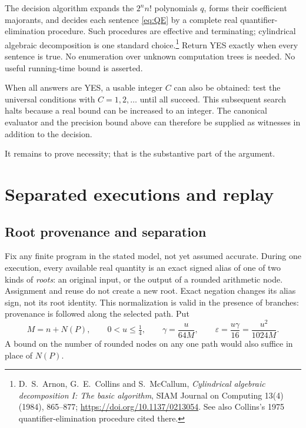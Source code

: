 \documentclass[11pt,a4paper]{article}
\theoremstyle{definition}
\theoremstyle{remark}
\begin{document}
The decision algorithm expands the $2^n n!$ polynomials $q$, forms their
coefficient majorants, and decides each sentence \eqref{eq:QE} by a complete
real quantifier-elimination procedure. Such procedures are effective and
terminating; cylindrical algebraic decomposition is one standard
choice.\footnote{\label{fn:cad}D.~S.~Arnon, G.~E.~Collins and S.~McCallum,
\emph{Cylindrical algebraic decomposition I: The basic algorithm}, SIAM Journal
on Computing 13(4) (1984), 865--877;
\url{https://doi.org/10.1137/0213054}. See also Collins's 1975 quantifier-elimination
procedure cited there.}
Return YES exactly when every sentence is true. No enumeration over unknown
computation trees is needed. No useful running-time bound is asserted.

When all answers are YES, a usable integer $C$ can also be obtained: test the
universal conditions with $C=1,2,\ldots$ until all succeed. This subsequent
search halts because a real bound can be increased to an integer. The
canonical evaluator and the precision bound above can therefore be supplied
as witnesses in addition to the decision.

It remains to prove necessity; that is the substantive part of the argument.

\section{Separated executions and replay}

\subsection{Root provenance and separation}

Fix any finite program in the stated model, not yet assumed accurate. During
one execution, every available real quantity is an exact signed alias of
one of two kinds of \emph{roots}: an original input, or the output of a rounded
arithmetic node. Assignment and reuse do not create a new root. Exact
negation changes its alias sign, not its root identity. This normalization is
valid in the presence of branches: provenance is followed along the selected
path. Put
\begin{equation}\label{eq:constants}
 M=n+N(P),\qquad 0<u\le\tfrac14,\qquad
 \gamma=\frac{u}{64M},\qquad
 \varepsilon=\frac{u\gamma}{16}=\frac{u^2}{1024M}.
\end{equation}
A bound on the number of rounded nodes on any one path would also suffice in
place of $N(P)$.
\end{document}

